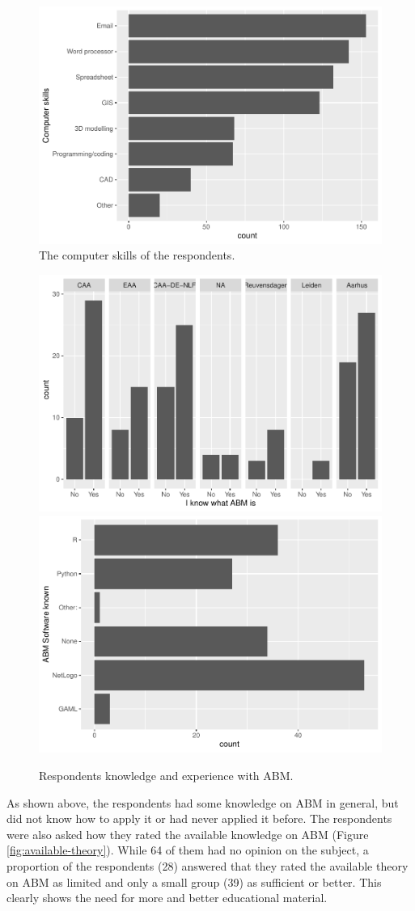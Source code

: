 \documentclass[
]{article}
\begin{document}
\begin{figure}
\includegraphics[width=0.5\linewidth]{paper_files/figure-latex/computer-skills-1} \caption{The computer skills of the respondents.}\label{fig:computer-skills}
\end{figure}

\begin{figure}
\includegraphics[width=0.5\linewidth]{paper_files/figure-latex/abm-knowledge-1} \includegraphics[width=0.5\linewidth]{paper_files/figure-latex/abm-knowledge-2} \caption{Respondents knowledge and experience with ABM.}\label{fig:abm-knowledge}
\end{figure}

As shown above, the respondents had some knowledge on ABM in general, but did not know how to apply it or had never applied it before. The respondents were also asked how they rated the available knowledge on ABM (Figure \ref{fig:available-theory}). While 64 of them had no opinion on the subject, a proportion of the respondents (28) answered that they rated the available theory on ABM as limited and only a small group (39) as sufficient or better. This clearly shows the need for more and better educational material.
\end{document}
